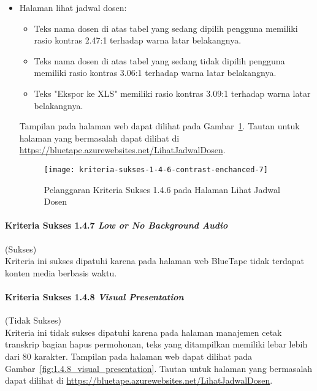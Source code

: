 \begin{itemize}
    \item Halaman lihat jadwal dosen: 
    \begin{itemize}
        \item Teks nama dosen di atas tabel yang sedang dipilih pengguna memiliki rasio kontras 2.47:1 terhadap warna latar belakangnya.
        \item Teks nama dosen di atas tabel yang sedang tidak dipilih pengguna memiliki rasio kontras 3.06:1 terhadap warna latar belakangnya.
        \item Teks "Ekspor ke XLS" memiliki rasio kontras 3.09:1 terhadap warna latar belakangnya.
    \end{itemize}
    Tampilan pada halaman web dapat dilihat pada \mbox{Gambar \ref{fig:1.4.6_contrast_enchanced_7}}. Tautan untuk halaman yang bermasalah dapat dilihat di \url{https://bluetape.azurewebsites.net/LihatJadwalDosen}.
    \begin{figure}[H]
        \centering  
        \texttt{[image: kriteria-sukses-1-4-6-contrast-enchanced-7]}  
        \caption[Pelanggaran Kriteria Sukses 1.4.6 pada Halaman Lihat Jadwal Dosen]{Pelanggaran Kriteria Sukses 1.4.6 pada Halaman Lihat Jadwal Dosen}
        \label{fig:1.4.6_contrast_enchanced_7}  
    \end{figure} 
\end{itemize}

\paragraph{Kriteria Sukses 1.4.7 \textit{Low or No Background Audio}}
\label{par:kepatuhan_bluetape_kriteria_sukses_1.4.7}
(Sukses)\\

Kriteria ini sukses dipatuhi karena pada halaman web BlueTape tidak terdapat konten media berbasis waktu.

\paragraph{Kriteria Sukses 1.4.8 \textit{Visual Presentation}}
\label{par:kepatuhan_bluetape_kriteria_sukses_1.4.8}
(Tidak Sukses)\\

Kriteria ini tidak sukses dipatuhi karena pada halaman manajemen cetak transkrip bagian hapus permohonan, teks yang ditampilkan memiliki lebar lebih dari 80 karakter. Tampilan pada halaman web dapat dilihat pada \mbox{Gambar \ref{fig:1.4.8_visual_presentation}}. Tautan untuk halaman yang bermasalah dapat dilihat di \url{https://bluetape.azurewebsites.net/LihatJadwalDosen}.

